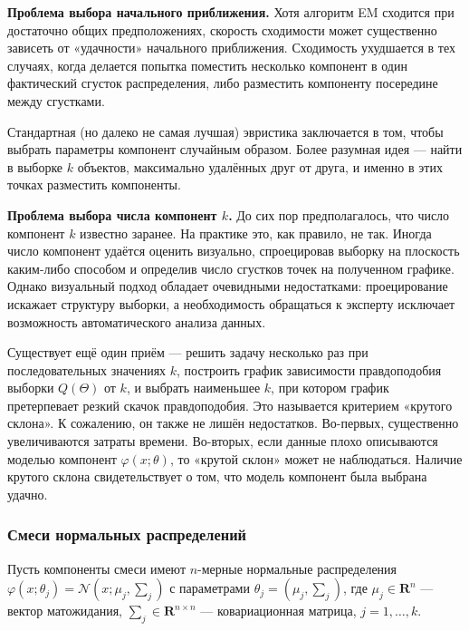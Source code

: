     \vspace{\baselineskip}
    \textbf{Проблема выбора начального приближения.} Хотя алгоритм EM сходится при достаточно общих предположениях, скорость сходимости может существенно зависеть от «удачности» начального приближения. Сходимость ухудшается в тех случаях, когда делается попытка поместить несколько компонент в один фактический сгусток распределения, либо разместить компоненту посередине между сгустками.
    
    Стандартная (но далеко не самая лучшая) эвристика заключается в том, чтобы выбрать параметры компонент случайным образом. Более разумная идея --- найти в выборке $k$ объектов, максимально удалённых друг от друга, и именно в этих точках разместить компоненты.
    
    \vspace{\baselineskip}
    \textbf{Проблема выбора числа компонент $k$.} До сих пор предполагалось, что число компонент $k$ известно заранее. На практике это, как правило, не так. Иногда число компонент удаётся оценить визуально, спроецировав выборку на плоскость каким-либо способом и определив число сгустков точек на полученном графике. Однако визуальный подход обладает очевидными недостатками: проецирование искажает структуру выборки, а необходимость обращаться к эксперту исключает возможность автоматического анализа данных.
    
    Существует ещё один приём --- решить задачу несколько раз при последовательных значениях $k$, построить график зависимости правдоподобия выборки $Q(\Theta)$ от $k$, и выбрать наименьшее $k$, при котором график претерпевает резкий скачок правдоподобия. Это называется критерием «крутого склона». К сожалению, он также не лишён недостатков. Во-первых, существенно увеличиваются затраты времени. Во-вторых, если данные плохо описываются моделью компонент $\varphi(x; \theta)$, то «крутой склон» может не наблюдаться. Наличие крутого склона свидетельствует о том, что модель компонент была выбрана удачно.

    \subsubsection{Смеси нормальных распределений}
    
    Пусть компоненты смеси имеют $n$-мерные нормальные распределения $\varphi(x; \theta_j) = \mathcal{N}(x; \mu_j, \sum_j)$ с параметрами $\theta_j = (\mu_j, \sum_j)$, где $\mu_j \in \mathbf{R}^n$ --- вектор матожидания, $\sum_j \in \mathbf{R}^{n \times n}$ --- ковариационная матрица, $j = 1, \dots, k$.
    
